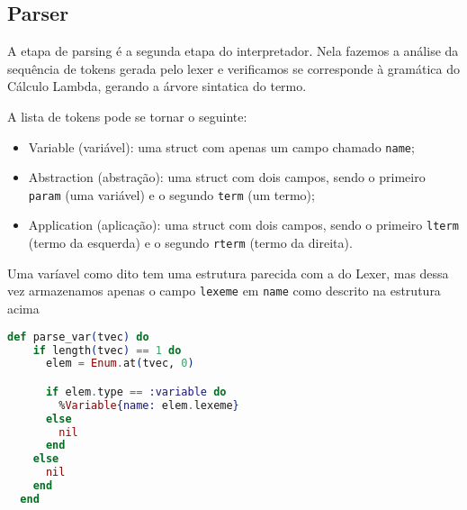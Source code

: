 \documentclass[12pt]{article}
\begin{document}
\subsection{Parser}

A etapa de parsing é a segunda etapa do interpretador. Nela fazemos a análise da sequência de tokens gerada pelo lexer e verificamos se corresponde à gramática do Cálculo Lambda, gerando a árvore sintatica do termo.

A lista de tokens pode se tornar o seguinte:
\begin{itemize}
	\item Variable (variável): uma struct com apenas um campo chamado \texttt{name};
	\item Abstraction (abstração): uma struct com dois campos, sendo o primeiro \texttt{param} (uma variável) e o segundo \texttt{term} (um termo);
	\item Application (aplicação): uma struct com dois campos, sendo o primeiro \texttt{lterm} (termo da esquerda) e o segundo \texttt{rterm} (termo da direita).
\end{itemize}

Uma varíavel como dito tem uma estrutura parecida com a do Lexer, mas dessa vez armazenamos apenas o campo \texttt{lexeme} em \texttt{name} como descrito na estrutura acima
\begin{lstlisting}[language=elixir, caption=Função \texttt{parse var}] 
  def parse_var(tvec) do
    if length(tvec) == 1 do
      elem = Enum.at(tvec, 0)

      if elem.type == :variable do
        %Variable{name: elem.lexeme}
      else
        nil
      end
    else
      nil
    end
  end
\end{lstlisting}
\end{document}
